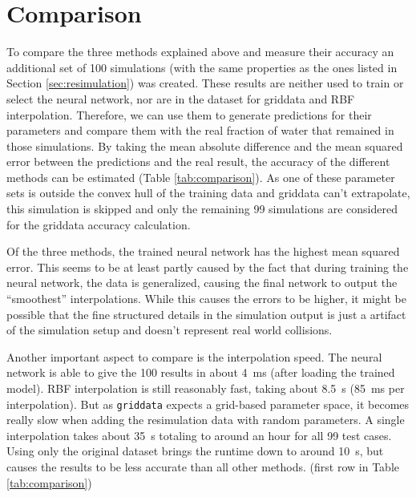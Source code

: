 \section{Comparison}
\label{sec:comparison}

To compare the three methods explained above and measure their accuracy an additional set of 100 simulations (with the same properties as the ones listed in Section \ref{sec:resimulation}) was created. These results are neither used to train or select the neural network, nor are in the dataset for griddata and RBF interpolation. Therefore, we can use them to generate predictions for their parameters and compare them with the real fraction of water that remained in those simulations. By taking the mean absolute difference and the mean squared error between the predictions and the real result, the accuracy of the different methods can be estimated (Table \ref{tab:comparison}). As one of these parameter sets is outside the convex hull of the training data and griddata can't extrapolate, this simulation is skipped and only the remaining 99 simulations are considered for the griddata accuracy calculation. 

Of the three methods, the trained neural network has the highest mean squared error. This seems to be at least partly caused by the fact that during training the neural network, the data is generalized, causing the final network to output the \enquote{smoothest} interpolations. While this causes the errors to be higher, it might be possible that the fine structured details in the simulation output is just a artifact of the simulation setup and doesn't represent real world collisions.

Another important aspect to compare is the interpolation speed. The neural network is able to give the 100 results in about \SI{4}{\milli\second} (after loading the trained model). RBF interpolation is still reasonably fast, taking about \SI{8.5}{\second} (\SI{85}{\milli\second} per interpolation). But as \texttt{griddata} expects a grid-based parameter space, it becomes really slow when adding the resimulation data with random parameters. A single interpolation takes about \SI{35}{\second} totaling to around an hour for all 99 test cases. Using only the original dataset brings the runtime down to around \SI{10}{\second}, but causes the results to be less accurate than all other methods. (first row in Table \ref{tab:comparison})

